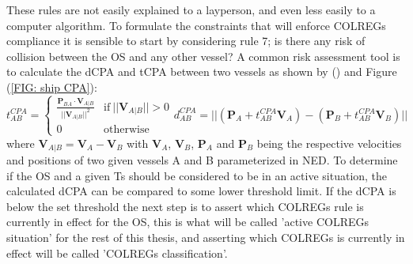 These rules are not easily explained to a layperson, and even less easily to a computer algorithm. To formulate the constraints that will
enforce \gls{COLREGs} compliance it is sensible to start by considering rule 7; is there any risk of collision between the \gls{OS}
and any other vessel? A common risk assessment tool is to calculate the \gls{dCPA} and \gls{tCPA} between two vessels as shown by (\cite{Kufoalor2018}) and Figure (\ref{FIG: ship CPA}):
\begin{subequations}    \label{eq:tCPAdCPA}
    \begin{equation}
        t_{AB}^{CPA} = 
        \begin{cases}
          \frac{\textbf{P}_{BA} \cdot \textbf{V}_{A|B}}{||\textbf{V}_{A|B}||^2} & \text{if}\ ||\textbf{V}_{A|B}|| > 0 \\
          0 & \text{otherwise}
        \end{cases}
    \end{equation}
    \begin{equation}
        d_{AB}^{CPA} = ||(\textbf{P}_A + t_{AB}^{CPA} \textbf{V}_A) - (\textbf{P}_B + t_{AB}^{CPA} \textbf{V}_B)||
    \end{equation}
\end{subequations}
where $\textbf{V}_{A|B} = \textbf{V}_A - \textbf{V}_B$ with $\textbf{V}_A$, $\textbf{V}_B$, $\textbf{P}_A$ and $\textbf{P}_B$ being the respective
velocities and positions of two given vessels A and B parameterized in NED. To determine if the \gls{OS} and a given \gls{Ts} should be
considered to be in an active situation, the calculated \gls{dCPA} can be compared to some lower threshold limit. If the \gls{dCPA} is below the set threshold
the next step is to assert which \gls{COLREGs} rule is currently in effect for the \gls{OS}, this is what will be called 'active \gls{COLREGs}
situation' for the rest of this thesis, and asserting which \gls{COLREGs} is currently in effect will be called 'COLREGs classification'.

